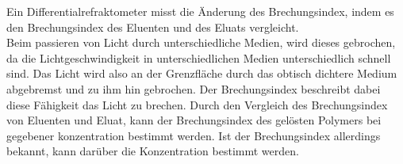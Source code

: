 \documentclass[10pt,a4paper,ngerman]{scrartcl}
\begin{document}
		Ein Differentialrefraktometer misst die Änderung des Brechungsindex, indem es den Brechungsindex des Eluenten und des Eluats vergleicht. \\
		Beim passieren von Licht durch unterschiedliche Medien, wird dieses gebrochen, da die Lichtgeschwindigkeit in unterschiedlichen Medien 
		unterschiedlich schnell sind. Das Licht wird also an der Grenzfläche durch das obtisch dichtere Medium abgebremst und zu ihm hin gebrochen. 
		Der Brechungsindex beschreibt dabei diese Fähigkeit das Licht zu brechen. Durch den Vergleich des Brechungsindex von Eluenten und Eluat, 
		kann der Brechungsindex des gelösten Polymers bei gegebener konzentration bestimmt werden. Ist der Brechungsindex allerdings bekannt, kann 
		darüber die Konzentration bestimmt werden. \cite{noauthor_refraktometer_2023}



\printbibliography
\end{document}
